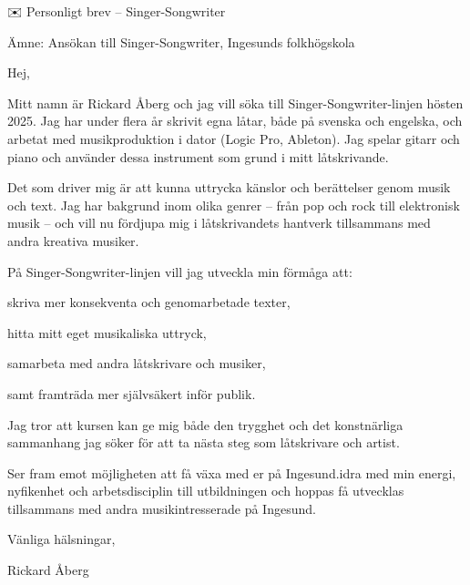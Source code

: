 \documentclass[a4paper,10pt]{letter}
\begin{document}
\begin{letter}{✉️ Personligt brev – Singer-Songwriter

Ämne: Ansökan till Singer-Songwriter, Ingesunds folkhögskola}
\opening{Hej,}
Mitt namn är Rickard Åberg och jag vill söka till Singer-Songwriter-linjen hösten 2025.
Jag har under flera år skrivit egna låtar, både på svenska och engelska, och arbetat med musikproduktion i dator (Logic Pro, Ableton). Jag spelar gitarr och piano och använder dessa instrument som grund i mitt låtskrivande.

Det som driver mig är att kunna uttrycka känslor och berättelser genom musik och text. Jag har bakgrund inom olika genrer – från pop och rock till elektronisk musik – och vill nu fördjupa mig i låtskrivandets hantverk tillsammans med andra kreativa musiker.

På Singer-Songwriter-linjen vill jag utveckla min förmåga att:

skriva mer konsekventa och genomarbetade texter,

hitta mitt eget musikaliska uttryck,

samarbeta med andra låtskrivare och musiker,

samt framträda mer självsäkert inför publik.

Jag tror att kursen kan ge mig både den trygghet och det konstnärliga sammanhang jag söker för att ta nästa steg som låtskrivare och artist.

Ser fram emot möjligheten att få växa med er på Ingesund.idra med min energi, nyfikenhet och arbetsdisciplin till utbildningen och hoppas få utvecklas tillsammans med andra musikintresserade på Ingesund.
\closing{Vänliga hälsningar,}

\vspace{1em}

Rickard Åberg\\
[0709431401] \\
[raberg@duck.com]
\end{letter}
\end{document}
